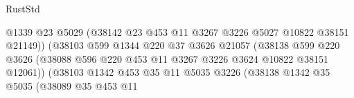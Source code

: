 \begin{lexlean}{RustStd}
\begin{coremodule}
                                            @1339
                                            @23
                                            @5029
                                            (@38142
                                              @23
                                              @453
                                              @11
                                              @3267
                                              @3226
                                              @5027
                                              @10822
                                              @38151
                                              @21149))
                                          (@38103
                                            @599
                                            @1344
                                            @220
                                            @37
                                            @3626
                                            @21057
                                            (@38138
                                              @599
                                              @220
                                              @3626
                                              (@38088
                                                @596
                                                @220
                                                @453
                                                @11
                                                @3267
                                                @3226
                                                @3624
                                                @10822
                                                @38151
                                                @12061))
                                            (@38103
                                              @1342
                                              @453
                                              @35
                                              @11
                                              @5035
                                              @3226
                                              (@38138
                                                @1342
                                                @35
                                                @5035
                                                (@38089
                                                  @35
                                                  @453
                                                  @11

\end{coremodule}
\end{lexlean}
